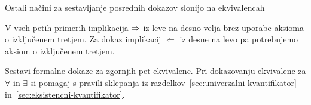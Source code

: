 Ostali načini za sestavljanje posrednih dokazov slonijo na
ekvivalencah
%
%
V vseh petih primerih implikacija $\Rightarrow$ iz leve na desno velja brez
uporabe aksioma o izključenem tretjem. Za dokaz implikacij
$\Leftarrow$ iz desne na levo pa potrebujemo aksiom o izključenem
tretjem.

\begin{naloga}
  Sestavi formalne dokaze za zgornjih pet ekvivalenc. Pri dokazovanju
  ekvivalenc za $\forall$ in $\exists$ si pomagaj s pravili sklepanja
  iz razdelkov~\ref{sec:univerzalni-kvantifikator}
  in~\ref{sec:eksistencni-kvantifikator}.
\end{naloga}


